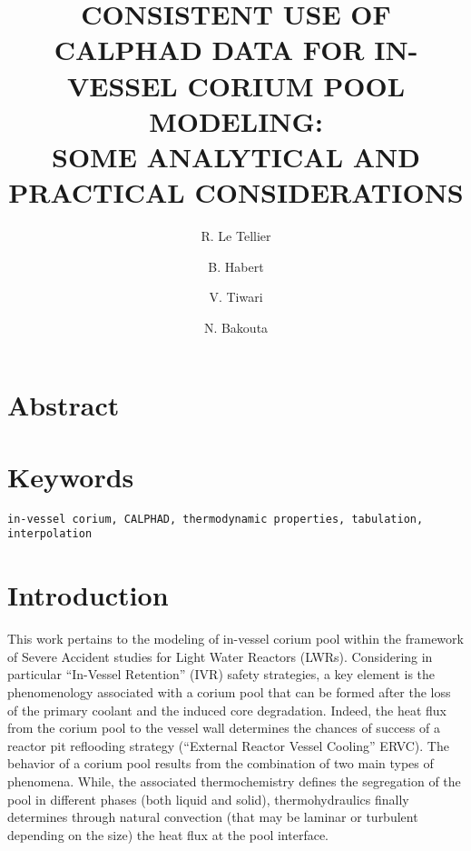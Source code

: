 \documentclass[11pt]{article}\usepackage{geometry} \geometry{letterpaper, margin=25.4mm}
\begin{document}
\title{\vspace{-1em}\bf \MakeUppercase{Consistent use of CALPHAD data for in-vessel corium pool modeling:} \\ \MakeUppercase{some analytical and practical considerations}}
\date{}

\author{R. Le Tellier}
\author{B. Habert}  
\author{V. Tiwari}  
\author{N. Bakouta}

\maketitle

\thispagestyle{fancy}

\section*{Abstract} 

\section*{\hfill Keywords}
\hfill \texttt{in-vessel corium, CALPHAD, thermodynamic properties, tabulation, interpolation}

\section{Introduction}

This work pertains to the modeling of in-vessel corium pool within the framework of Severe Accident studies for Light Water Reactors (LWRs). Considering in particular ``In-Vessel Retention'' (IVR) safety strategies, a key element is the phenomenology associated with a corium pool that can be formed after the loss of the primary coolant and the induced core degradation. Indeed, the heat flux from the corium pool to the vessel wall determines the chances of success of a reactor pit reflooding strategy (``External Reactor Vessel Cooling'' ERVC). The behavior of a corium pool results from the combination of two main types of phenomena. While, the associated thermochemistry defines the segregation of the pool in different phases (both liquid and solid), thermohydraulics finally determines through natural convection (that may be laminar or turbulent depending on the size) the heat flux at the pool interface.
\end{document}
